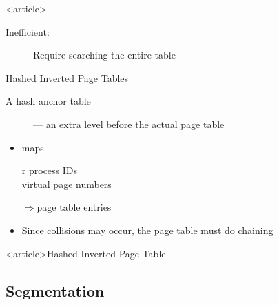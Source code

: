 \begin{frame}<article>
  \begin{description}
  \item[Inefficient:] Require searching the entire table 
  \end{description}
  \begin{center}
  \end{center}
\end{frame}

\begin{frame}{Hashed Inverted Page Tables}
  \begin{description}
  \item[A hash anchor table] --- an extra level before the actual page table 
  \end{description}
  \begin{itemize}
  \item maps
    \begin{scriptsize}
      \begin{tblr}{r}
        {process IDs\\virtual page numbers}
      \end{tblr}
    \end{scriptsize}
    $\Rightarrow{}$page table entries
  \item Since collisions may occur, the page table must do chaining
  \end{itemize}
  \centering
\end{frame}

\begin{frame}<article>{Hashed Inverted Page Table}
  \begin{center}
  \end{center}
\end{frame}

\subsection{Segmentation}

